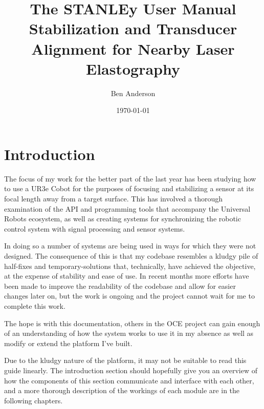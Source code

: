 \documentclass[11pt]{article}
\date{\today}
\author{Ben Anderson}
\title{The STANLEy User Manual \\[1ex] \large Stabilization and Transducer Alignment for Nearby Laser Elastography}
\begin{document}
\newcommand\connect[2]{\path[draw,arrow] (#1) |- ($(#1)!1/2!(#2)$) -| (#2)}
\newcommand\ImageNode[3][]{
  \node[draw=arrowblue!80!black,line width=1pt,#1] (#2) {\texttt{[image: \#3]}};
}

\maketitle
\tableofcontents
\parskip=6pt

\section{Introduction}\label{sec:intro}

The focus of my work for the better part of the last year has been studying how to use a UR3e Cobot for the purposes of focusing and stabilizing a sensor at its focal length away from a target surface. This has involved a thorough examination of the API and programming tools that accompany the Universal Robots ecosystem, as well as creating systems for synchronizing the robotic control system with signal processing and sensor systems.

In doing so a number of systems are being used in ways for which they were not designed. The consequence of this is that my codebase resembles a kludgy pile of half-fixes and temporary-solutions that, technically, have achieved the objective, at the expense of stability and ease of use.
In recent months more efforts have been made to improve the readability of the codebase and allow for easier changes later on, but the work is ongoing and the project cannot wait for me to complete this work.

The hope is with this documentation, others in the OCE project can gain enough of an understanding of how the system works to use it in my absence as well as modify or extend the platform I've built.

Due to the kludgy nature of the platform, it may not be suitable to read this guide linearly. The introduction section should hopefully give you an overview of how the components of this section communicate and interface with each other, and a more thorough description of the workings of each module are in the following chapters.
\end{document}
